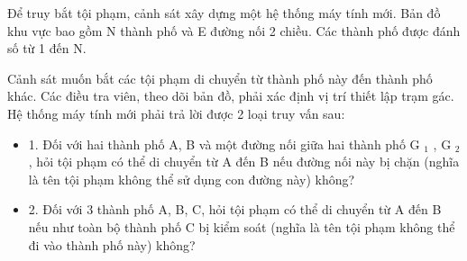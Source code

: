 Để truy bắt tội phạm, cảnh sát xây dựng một hệ thống máy tính mới. Bản đồ khu vực bao gồm N thành phố và E đường nối 2 chiều. Các thành phố được đánh số từ 1 đến N.  

   Cảnh sát muốn bắt các tội phạm di chuyển từ thành phố này đến thành phố khác. Các điều tra viên, theo dõi bản đồ, phải xác định vị trí thiết lập trạm gác. Hệ thống máy tính mới phải trả lời được 2 loại   truy vấn sau:  
\begin{itemize}
	\item     1. Đối với hai thành phố A, B và một đường nối giữa hai thành phố G    $_     1    $    , G    $_     2    $    , hỏi tội phạm có thể di chuyển từ A đến B nếu đường nối này bị chặn (nghĩa là tên tội phạm không   thể sử dụng con đường này) không?   
	\item     2. Đối với 3 thành phố A, B, C, hỏi tội phạm có thể di chuyển từ A đến B nếu như toàn bộ thành phố C bị kiểm soát (nghĩa là tên tội phạm không thể đi vào thành phố này) không?   
\end{itemize}

\